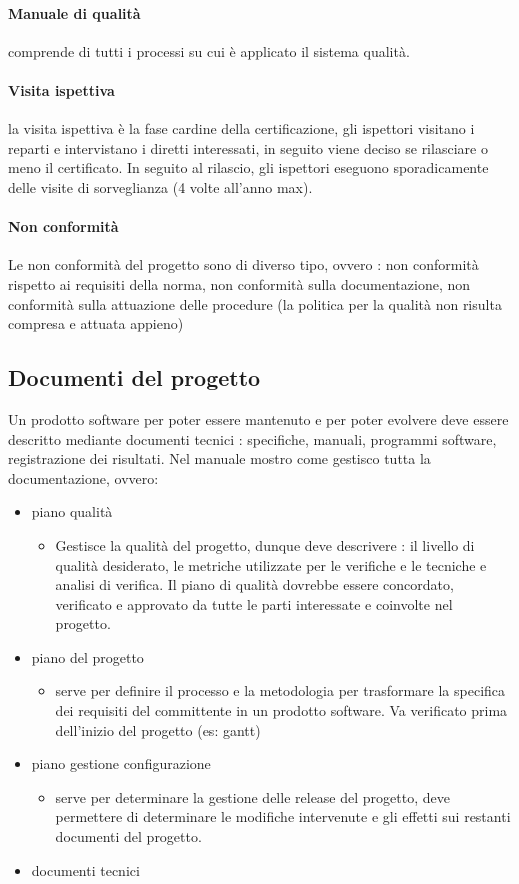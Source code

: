 \documentclass[a4paper,12pt]{report}
\begin{document}
	\paragraph{Manuale di qualità} comprende di tutti i processi su cui è applicato il sistema qualità.
	\paragraph{Visita ispettiva} la visita ispettiva è la fase cardine della certificazione, gli ispettori visitano i reparti e intervistano i diretti interessati, in seguito viene deciso se rilasciare o meno il certificato. In seguito al rilascio, gli ispettori eseguono sporadicamente delle visite di sorveglianza (4 volte all'anno max).
	\paragraph{Non conformità}
	Le non conformità del progetto sono di diverso tipo, ovvero : non conformità rispetto ai requisiti della norma, non conformità sulla documentazione, non conformità sulla attuazione delle procedure (la politica per la qualità non risulta compresa e attuata appieno)
	\subsection{Documenti del progetto}
	Un prodotto software per poter essere mantenuto e per poter evolvere deve essere descritto mediante documenti tecnici : specifiche, manuali, programmi software, registrazione dei risultati. Nel manuale mostro come gestisco tutta la documentazione, ovvero:
	\begin{itemize}
		\item piano qualità
		\begin{itemize}
			\item Gestisce la qualità del progetto, dunque deve descrivere : il livello di qualità desiderato, le metriche utilizzate per le verifiche e le tecniche e analisi di verifica. Il piano di qualità dovrebbe essere concordato, verificato e approvato da tutte le parti interessate e coinvolte nel progetto.
		\end{itemize}
		\item piano del progetto
		\begin{itemize}
			\item serve per definire il processo e la metodologia per trasformare la specifica dei requisiti del committente in un prodotto software. Va verificato prima dell'inizio del progetto (es: gantt)
		\end{itemize}
		\item piano gestione configurazione
		\begin{itemize}
			\item serve per determinare la gestione delle release del progetto, deve permettere di determinare le modifiche intervenute e gli effetti sui restanti documenti del progetto.
		\end{itemize}
		\item documenti tecnici
	\end{itemize}
\end{document}
